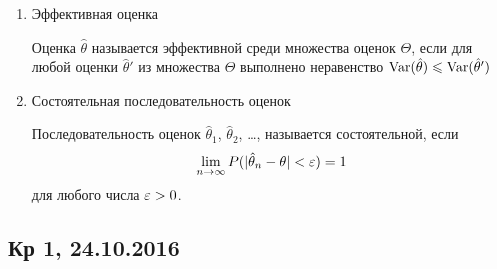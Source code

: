 \documentclass[12pt, a4paper]{article}
\begin{document}
\begin{enumerate}
\begin{enumerate}
\item Эффективная оценка

Оценка $\hat \theta$ называется эффективной среди множества оценок $\Theta$, если для любой оценки $\hat \theta'$ из множества $\Theta$ выполнено неравенство $\operatorname{Var}(\hat \theta) \leqslant \operatorname{Var}(\hat \theta')$

\item Состоятельная последовательность оценок

Последовательность оценок $\hat \theta_1$, $\hat \theta_2$, \ldots, называется состоятельной, если
\[
\lim_{n\to\infty} P(|\hat \theta_n - \theta| < \varepsilon) = 1
\]
для любого числа $\varepsilon >0$.


\end{enumerate}



\end{enumerate}





\subsection{Кр 1, 24.10.2016}



\end{document}
